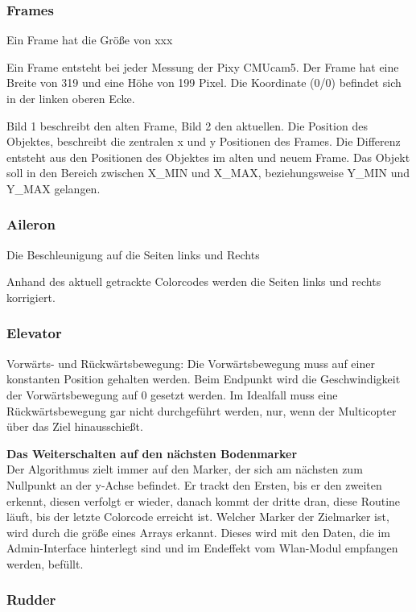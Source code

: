     \subsubsection{Frames}

    Ein Frame hat die Größe von xxx

    Ein Frame entsteht bei jeder Messung der Pixy CMUcam5. Der Frame hat eine Breite von 319 und eine Höhe von 199 Pixel. Die Koordinate (0/0) befindet sich in der linken oberen Ecke.

    Bild 1 beschreibt den alten Frame, Bild 2 den aktuellen. Die Position des Objektes, beschreibt die zentralen x und y Positionen des Frames. Die Differenz entsteht aus den Positionen des Objektes im alten und neuem Frame. Das Objekt soll in den Bereich zwischen X\_MIN und X\_MAX, beziehungsweise Y\_MIN und Y\_MAX gelangen.


    \subsubsection{Aileron}

    Die Beschleunigung auf die Seiten links und Rechts

    Anhand des aktuell getrackte Colorcodes werden die Seiten links und rechts korrigiert.

    \subsubsection{Elevator}
    Vorwärts- und Rückwärtsbewegung: Die Vorwärtsbewegung muss auf einer konstanten Position gehalten werden. Beim Endpunkt wird die Geschwindigkeit der Vorwärtsbewegung auf 0 gesetzt werden. Im Idealfall muss eine Rückwärtsbewegung gar nicht durchgeführt werden, nur, wenn der Multicopter über das Ziel hinausschießt.

    \textbf{Das Weiterschalten auf den nächsten Bodenmarker}\\
    Der Algorithmus zielt immer auf den Marker, der sich am nächsten zum Nullpunkt an der y-Achse befindet. Er trackt den Ersten, bis er den zweiten erkennt, diesen verfolgt er wieder, danach kommt der dritte dran, diese Routine läuft, bis der letzte Colorcode erreicht ist. Welcher Marker der Zielmarker ist, wird durch die größe eines Arrays erkannt. Dieses wird mit den Daten, die im Admin-Interface hinterlegt sind und im Endeffekt vom Wlan-Modul empfangen werden, befüllt.

    \subsubsection{Rudder}

